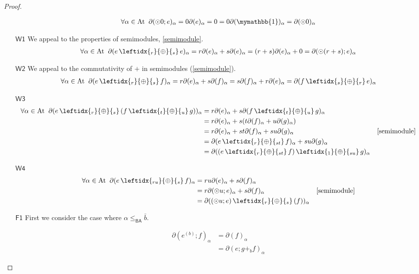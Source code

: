 \documentclass[a4paper,UKenglish,cleveref, autoref, thm-restate]{lipics-v2021}
\newcommand{\At}{\text{\upshape{At}}}
\newcommand{\BA}{\textsf{BA}}
\newcommand{\WC}[2]{\,\leftidx{_{#1}}{{\oplus}}{_{#2}}\,}
\newcommand{\Ax}[1]{\ensuremath{\mathsf{#1}}}
\newcommand{\bskip}{\mymathbb{1}}
\theoremstyle{plain}\newtheoremrep{thm}{Theorem}[section]
\begin{document}
\begin{toappendix}
\begin{proof}
\begin{enumerate}
				\begin{align*}\forall \alpha \in \At\;\;\partial(\odot 0;e)_\alpha = 0\partial(e)_\alpha = 0 = 0 \partial(\bskip)_\alpha = \partial(\odot 0)_\alpha
				\end{align*}
				\item[\Ax{W1}]
				We appeal to the properties of semimodules, \cref{semimodule}.
				\begin{align*}
					\forall \alpha \in \At\;\;\partial(e \WC{r}{s} e)_\alpha = r\partial(e)_\alpha + s\partial(e)_\alpha = (r+s)\partial(e)_\alpha+0 = \partial(\odot(r+s);e)_\alpha
				\end{align*}
				\item[\Ax{W2}]
				We appeal to the commutativity of $+$ in semimodules (\cref{semimodule}).
				\begin{align*}
					\forall \alpha \in \At\;\;\partial(e \WC{r}{s} f)_\alpha = r\partial(e)_\alpha + s\partial(f)_\alpha = s\partial(f)_\alpha + r\partial(e)_\alpha = \partial(f \WC{s}{r} e)_\alpha
				\end{align*}
				\item[\Ax{W3}]
				\begin{align*}
					\forall \alpha \in \At\;\;\partial(e \WC{r}{s} (f \WC{t}{u} g))_\alpha &= r\partial(e)_\alpha + s\partial(f \WC{t}{u} g)_\alpha\\
					&= r\partial(e)_\alpha + s(t\partial(f)_\alpha + u\partial(g)_\alpha)\\
					&= r\partial(e)_\alpha + st\partial(f)_\alpha + su\partial(g)_\alpha & \cref{semimodule}\\
					&= \partial(e \WC{r}{st} f)_\alpha + su\partial(g)_\alpha\\
					&= \partial((e \WC{r}{st} f) \WC{1}{su}g)_\alpha
				\end{align*}
				\item[\Ax{W4}]
				\begin{align*}
					\forall \alpha \in \At\;\;\partial(e \WC{ru}{s} f)_\alpha &= ru\partial(e)_\alpha+s\partial(f)_\alpha\\
					&= r\partial(\odot u;e)_\alpha+s\partial(f)_\alpha &\cref{semimodule}\\
					&= \partial((\odot u;e) \WC{r}{s} (f))_\alpha
				\end{align*}
				\item[\Ax{F1}]
				First we consider the case where $\alpha \leq_{\BA} \bar b$.
				
				\begin{align*}
					\partial(e^{(b)};f)_\alpha &= \partial(f)_\alpha\\
					&= \partial(e;g +_b f)_\alpha
				\end{align*}
				

\end{enumerate}
\end{proof}
\end{toappendix}
\end{document}
